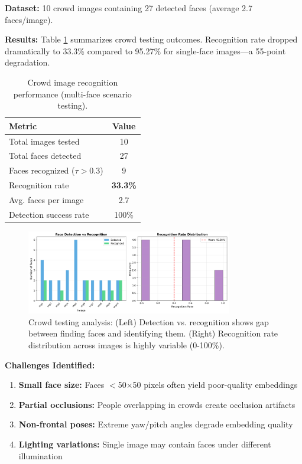 \documentclass[11pt,a4paper]{article}
\begin{document}
\textbf{Dataset:} 10 crowd images containing 27 detected faces (average 2.7 faces/image).

\textbf{Results:} Table \ref{tab:crowd} summarizes crowd testing outcomes. Recognition rate dropped dramatically to 33.3\% compared to 95.27\% for single-face images—a 55-point degradation.

\begin{table}[H]
\centering
\caption{Crowd image recognition performance (multi-face scenario testing).}
\label{tab:crowd}
\begin{tabular}{@{}lc@{}}
\toprule
\textbf{Metric} & \textbf{Value} \\ \midrule
Total images tested & 10 \\
Total faces detected & 27 \\
Faces recognized ($\tau > 0.3$) & 9 \\
Recognition rate & \textbf{33.3\%} \\
Avg. faces per image & 2.7 \\
Detection success rate & 100\% \\ \bottomrule
\end{tabular}
\end{table}

\begin{figure}[H]
    \centering
    \includegraphics[width=0.8\textwidth]{runs/crowd_analysis.png}
    \caption{Crowd testing analysis: (Left) Detection vs. recognition shows gap between finding faces and identifying them. (Right) Recognition rate distribution across images is highly variable (0-100\%).}
    \label{fig:crowd}
\end{figure}

\textbf{Challenges Identified:}
\begin{enumerate}
    \item \textbf{Small face size:} Faces $<$50×50 pixels often yield poor-quality embeddings
    \item \textbf{Partial occlusions:} People overlapping in crowds create occlusion artifacts
    \item \textbf{Non-frontal poses:} Extreme yaw/pitch angles degrade embedding quality
    \item \textbf{Lighting variations:} Single image may contain faces under different illumination
\end{enumerate}
\end{document}
